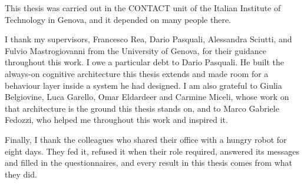 \begin{acknowledgements}

This thesis was carried out in the CONTACT unit of the Italian Institute of Technology in Genova, and it depended on many people there.

I thank my supervisors, Francesco Rea, Dario Pasquali, Alessandra Sciutti, and Fulvio Mastrogiovanni from the University of Genova, for their guidance throughout this work. I owe a particular debt to Dario Pasquali. He built the always-on cognitive architecture this thesis extends and made room for a behaviour layer inside a system he had designed. I am also grateful to Giulia Belgiovine, Luca Garello, Omar Eldardeer and Carmine Miceli, whose work on that architecture is the ground this thesis stands on, and to Marco Gabriele Fedozzi, who helped me throughout this work and inspired it.

Finally, I thank the colleagues who shared their office with a hungry robot for eight days. They fed it, refused it when their role required, answered its messages and filled in the questionnaires, and every result in this thesis comes from what they did.

\end{acknowledgements}
